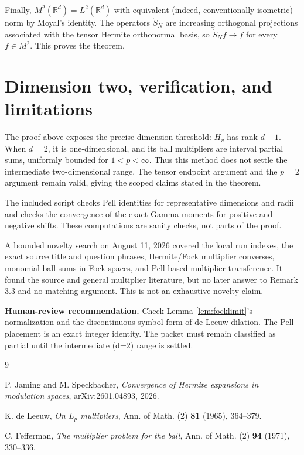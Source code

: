 \documentclass[11pt]{article}
\newcommand{\R}{\mathbb R}
\newcommand{\SN}{\mathring S}
\begin{document}
Finally, $M^2(\R^d)=L^2(\R^d)$ with equivalent (indeed, conventionally
isometric) norm by Moyal's identity.  The operators $\SN_N$ are increasing
orthogonal projections associated with the tensor Hermite orthonormal basis,
so $\SN_Nf\to f$ for every $f\in M^2$.  This proves the theorem.

\section*{Dimension two, verification, and limitations}

The proof above exposes the precise dimension threshold: $H_v$ has rank
$d-1$.  When $d=2$, it is one-dimensional, and its ball multipliers are
interval partial sums, uniformly bounded for $1<p<\infty$.  Thus this method
does not settle the intermediate two-dimensional range.  The tensor endpoint
argument and the $p=2$ argument remain valid, giving the scoped claims stated
in the theorem.

The included script checks Pell identities for representative dimensions and
radii and checks the convergence of the exact Gamma moments for positive and
negative shifts.  These computations are sanity checks, not parts of the
proof.

A bounded novelty search on August 11, 2026 covered the local run indexes, the
exact source title and question phrases, Hermite/Fock multiplier converses,
monomial ball sums in Fock spaces, and Pell-based multiplier transference.  It
found the source and general multiplier literature, but no later answer to
Remark 3.3 and no matching argument.  This is not an exhaustive novelty claim.

\medskip
\noindent\textbf{Human-review recommendation.}
Check Lemma \ref{lem:focklimit}'s normalization and the discontinuous-symbol
form of de Leeuw dilation.  The Pell placement is an exact integer identity.
The packet must remain classified as partial until the intermediate (d=2)
range is settled.

\begin{thebibliography}{9}

P. Jaming and M. Speckbacher,
\emph{Convergence of Hermite expansions in modulation spaces},
arXiv:2601.04893, 2026.

K. de Leeuw,
\emph{On $L_p$ multipliers},
Ann. of Math. (2) \textbf{81} (1965), 364--379.

C. Fefferman,
\emph{The multiplier problem for the ball},
Ann. of Math. (2) \textbf{94} (1971), 330--336.

\end{thebibliography}
\end{document}
